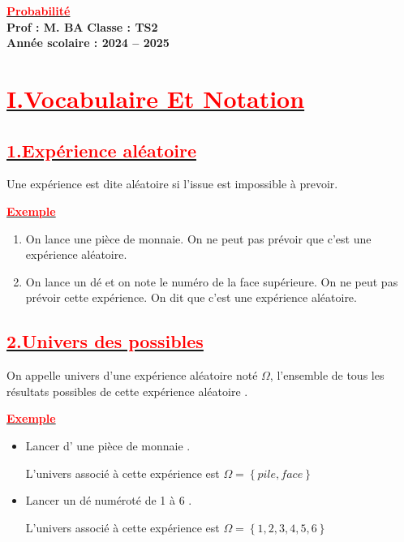 \documentclass[12pt,a4paper]{article}
\begin{document}
\begin{center}
    \Large\textbf{\underline{\textcolor{red}{Probabilité}}}\\[-0.1cm]
    \normalsize\textbf{Prof : M. BA} \hfill \textbf{Classe : TS2}\\[-0.1cm]
    \textbf{Année scolaire : 2024 -- 2025}
\end{center}

\section*{\underline{\textbf{\textcolor{red}{I.Vocabulaire Et Notation}}}}
\subsection*{\underline{\textbf{\textcolor{red}{1.Expérience aléatoire}}}}
Une expérience est dite aléatoire si l'issue est impossible à prevoir.

\underline{\textbf{\textcolor{red}{Exemple}}}\\

\begin{enumerate}
\item On lance une pièce de monnaie. On ne peut pas prévoir
que c’est une expérience aléatoire.
\item On lance un dé et on note le numéro de la face supérieure. On ne peut pas prévoir
cette expérience. On dit que c’est une expérience aléatoire.
\end{enumerate}
\subsection*{\underline{\textbf{\textcolor{red}{2.Univers des possibles}}}}
On appelle univers d’une expérience aléatoire noté $\Omega$, l’ensemble de tous les résultats possibles de cette expérience aléatoire .

\underline{\textbf{\textcolor{red}{Exemple}}}

\begin{itemize}
\item Lancer d’ une pièce de monnaie .

L’univers associé à cette expérience est $\Omega=\left\lbrace pile, face\right\rbrace$

\item Lancer un dé numéroté de 1 à 6 . 

L’univers associé à cette expérience est $\Omega=\left\lbrace 1, 2, 3, 4, 5, 6\right\rbrace$
\end{itemize}
\end{document}
